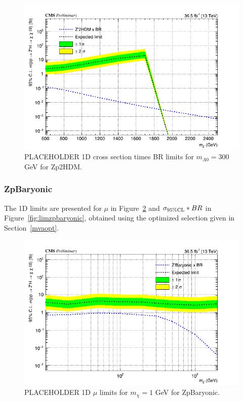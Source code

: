 \begin{figure}[tbh]
\centering
\includegraphics[width=5in]{figures/sigma_limits_4mu_Zp2HDM.png}
\caption{PLACEHOLDER 1D cross section times BR limits for $m_{A0} = 300$ GeV for Zp2HDM.}
\label{fig:limzp2hdm}
\end{figure}

\subsubsection{ZpBaryonic}

The 1D limits are presented for $\mu$ in Figure~\ref{fig:limzpbaryonicmu} and $\sigma_{95\% \rm{CL}}*BR$ in Figure~\ref{fig:limzpbaryonic}, obtained using the optimized selection given in Section~\ref{mvaopt}.

\begin{figure}[tbh]
\centering
\includegraphics[width=5in]{figures/sigma_limits_4mu_ZpBaryonic.png}
\caption{PLACEHOLDER 1D $\mu$ limits for $m_{\chi} = 1$ GeV for ZpBaryonic.}
\label{fig:limzpbaryonicmu}
\end{figure}

